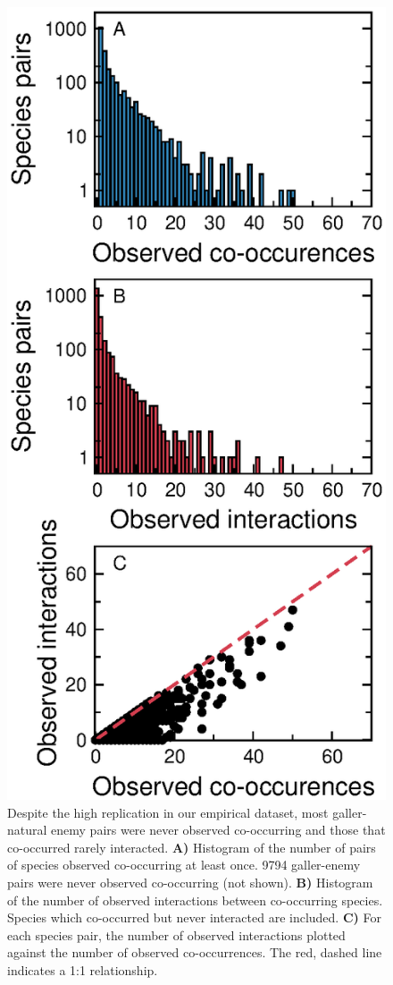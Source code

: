 \documentclass[12pt]{article}
\begin{document}
  \begin{figure}[h!]
      \caption{Despite the high replication in our empirical dataset, most galler-natural enemy pairs were never observed co-occurring and those that co-occurred rarely interacted. \textbf{A)} Histogram of the number of pairs of species observed co-occurring at least once. 9794 galler-enemy pairs were never observed co-occurring (not shown).
      \textbf{B)} Histogram of the number of observed interactions between co-occurring species. Species which co-occurred but never interacted are included. 
      \textbf{C)} For each species pair, the number of observed interactions plotted against the number of observed co-occurrences. The red, dashed line indicates a 1:1 relationship.}
      \label{histograms}
      \begin{center}
      \includegraphics*[height=.6\textheight]{Figure_2.eps}

\end{center}
\end{figure}
\end{document}
